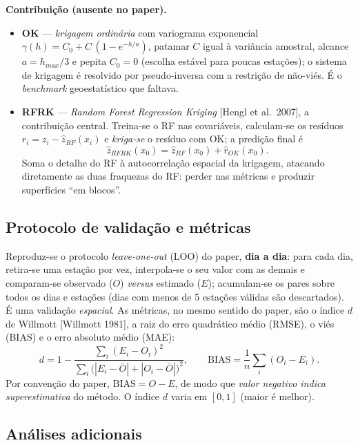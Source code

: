 \textbf{Contribuição (ausente no paper).}
\begin{itemize}
  \item \textbf{OK} --- \emph{krigagem ordinária} com variograma exponencial
        $\gamma(h) = C_0 + C\,(1 - e^{-h/a})$, patamar $C$ igual à variância
        amostral, alcance $a = h_{max}/3$ e pepita $C_0 = 0$ (escolha estável para
        poucas estações); o sistema de krigagem é resolvido por pseudo-inversa com
        a restrição de não-viés. É o \emph{benchmark} geoestatístico que faltava.
  \item \textbf{RFRK} --- \emph{Random Forest Regression Kriging}
        [Hengl et al.\ 2007], a contribuição central. Treina-se o RF nas
        covariáveis, calculam-se os resíduos $r_i = z_i - \hat z_{RF}(x_i)$ e
        \emph{kriga-se} o resíduo com OK; a predição final é
        \begin{equation}
          \hat z_{RFRK}(x_0) = \hat z_{RF}(x_0) + \hat r_{OK}(x_0).
        \end{equation}
        Soma o detalhe do RF à autocorrelação espacial da krigagem, atacando
        diretamente as duas fraquezas do RF: perder nas métricas e produzir
        superfícies ``em blocos''.
\end{itemize}

\subsection{Protocolo de validação e métricas}

Reproduz-se o protocolo \emph{leave-one-out} (LOO) do paper, \textbf{dia a dia}:
para cada dia, retira-se uma estação por vez, interpola-se o seu valor com as
demais e comparam-se observado ($O$) \emph{versus} estimado ($E$); acumulam-se os
pares sobre todos os dias e estações (dias com menos de 5 estações válidas são
descartados). É uma validação \emph{espacial}. As métricas, no mesmo sentido do
paper, são o índice $d$ de Willmott [Willmott 1981], a raiz do erro quadrático
médio (RMSE), o viés (BIAS) e o erro absoluto médio (MAE):
%
\begin{equation}
  d = 1 - \frac{\sum_i (E_i - O_i)^2}{\sum_i \bigl(|E_i - \bar O| + |O_i - \bar O|\bigr)^2},
  \qquad
  \mathrm{BIAS} = \frac{1}{n}\sum_i (O_i - E_i).
\end{equation}
%
Por convenção do paper, $\mathrm{BIAS} = O - E$, de modo que \emph{valor negativo
indica superestimativa} do método. O índice $d$ varia em $[0,1]$ (maior é melhor).

\subsection{Análises adicionais}

